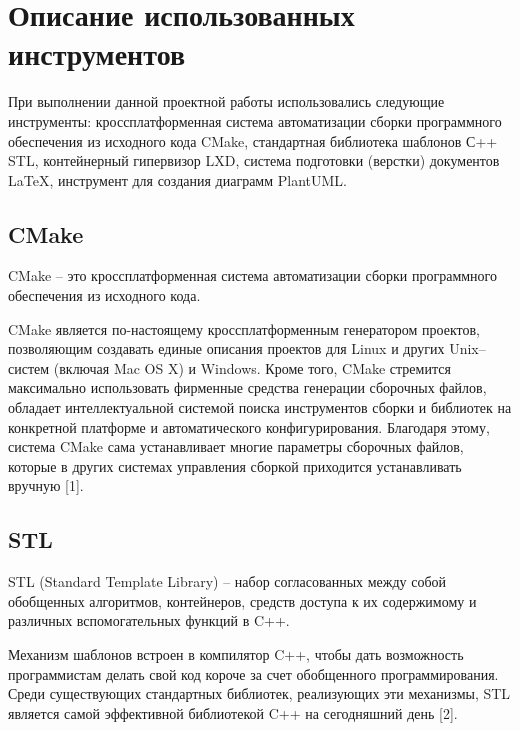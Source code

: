 \section{Описание использованных инструментов}

При выполнении данной проектной работы использовались следующие инструменты: кроссплатформенная система автоматизации сборки программного обеспечения из исходного кода CMake, стандартная библиотека шаблонов С++ STL, контейнерный гипервизор LXD, система подготовки (верстки) документов \LaTeX, инструмент для создания диаграмм PlantUML.\par 
\vspace{\baselineskip}

\subsection{CMake}  
CMake -- это кроссплатформенная система автоматизации сборки программного обеспечения из исходного кода.\par
CMake является по-настоящему кроссплатформенным генератором проектов, позволяющим создавать единые описания проектов для Linux и других Unix–систем (включая Mac OS X) и Windows. Кроме того, CMake стремится максимально использовать фирменные средства генерации сборочных файлов, обладает интеллектуальной системой поиска инструментов сборки и библиотек на конкретной платформе и автоматического конфигурирования. Благодаря этому, система CMake сама устанавливает многие параметры сборочных файлов, которые в других системах управления сборкой приходится устанавливать вручную [1].\par
 
\vspace{\baselineskip}

\subsection{STL} 
STL (Standard Template Library) -- набор согласованных между собой обобщенных алгоритмов, контейнеров, средств доступа к их содержимому и различных вспомогательных функций в C++.\par
Механизм шаблонов встроен в компилятор C++, чтобы дать возможность программистам делать свой код короче за счет обобщенного программирования. Среди существующих стандартных библиотек, реализующих эти механизмы, STL является самой эффективной библиотекой C++ на сегодняшний день [2].\par

